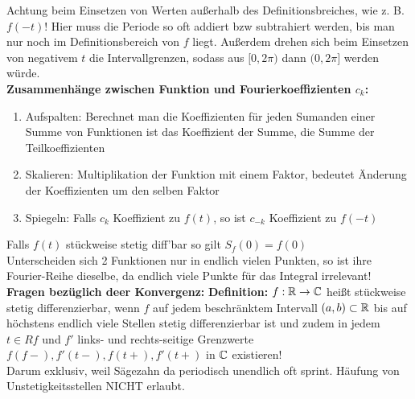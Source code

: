 \documentclass[nocolor,german]{latex4ei/latex4ei_sheet}
\begin{document}
Achtung beim Einsetzen von Werten au\ss{}erhalb des Definitionsbreiches, wie z. B. $f(-t)$! Hier muss die Periode so oft addiert bzw subtrahiert werden, bis man nur noch im Definitionsbereich von $f$ liegt. Au\ss{}erdem drehen sich beim Einsetzen von negativem $t$ die Intervallgrenzen, sodass aus $[0,2 \pi)$ dann $(0,2 \pi]$ werden w\"urde.\\
\textbf{Zusammenh\"ange zwischen Funktion und Fourierkoeffizienten $c_k$:}\\
\begin{enumerate}
	\item Aufspalten: Berechnet man die Koeffizienten f\"ur jeden Sumanden einer Summe von Funktionen ist das Koeffizient der Summe, die Summe der Teilkoeffizienten
	\item Skalieren: Multiplikation der Funktion mit einem Faktor, bedeutet \"Anderung der Koeffizienten um den selben Faktor
	\item Spiegeln: Falls $c_k$ Koeffizient zu $f(t)$, so ist $c_{-k}$ Koeffizient zu $f(-t)$
\end{enumerate}
Falls $f(t)$ st\"uckweise stetig diff'bar so gilt $S_f(0)=f(0)$\\
Unterscheiden sich 2 Funktionen nur in endlich vielen Punkten, so ist ihre Fourier-Reihe dieselbe, da endlich viele Punkte f\"ur das Integral irrelevant!\\
\textbf{Fragen bez\"uglich deer Konvergenz:}
\textbf{Definition:} $f:\operatorname{\mathbb R}\to\mathbb C$ hei\ss{}t st\"uckweise stetig differenzierbar, wenn $f$ auf jedem beschr\"anktem Intervall $(a,b) \subset \operatorname{\mathbb R}$ bis auf h\"ochstens endlich viele Stellen stetig differenzierbar ist und zudem in jedem $t \in R f$ und $f'$ links- und rechts-seitige Grenzwerte $f(f-),f'(t-),f(t+),f'(t+)$ in $\mathbb C$ existieren!\\
Darum exklusiv, weil S\"agezahn da periodisch unendlich oft sprint. H\"aufung von Unstetigkeitsstellen NICHT erlaubt.\\
\end{document}
